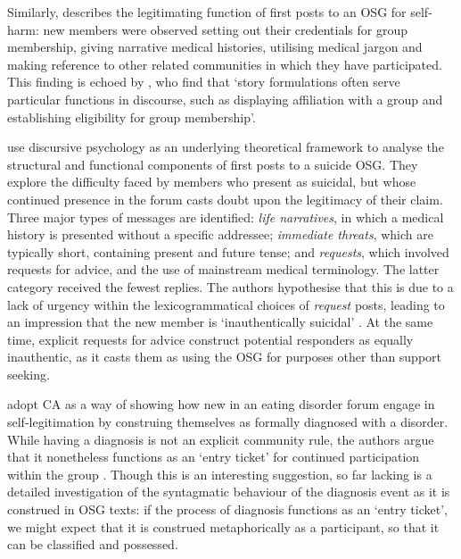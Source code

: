 Similarly, \textcite{smithson_membership_2011} describes the legitimating function of first \glspl{post} to an \gls{OSG} for self\hyp{}harm: new \glspl{member} were observed setting out their credentials for group membership, giving narrative medical histories, utilising medical jargon and making reference to other related communities in which they have participated. This finding is echoed by \textcite[p.~5]{varga2014grieving}, who find that `story formulations often serve particular functions in discourse, such as displaying affiliation with a group and establishing eligibility for group membership'.

\textcite[p.~173]{horne_doing_2009} use discursive psychology as an underlying theoretical framework to analyse the structural and functional components of first \glspl{post} to a suicide \gls{OSG}. They explore the difficulty faced by \glspl{member} who present as suicidal, but whose continued presence in the \gls{forum} casts doubt upon the legitimacy of their claim. Three major types of messages are identified: \emph{life narratives}, in which a medical history is presented without a specific addressee; \emph{immediate threats}, which are typically short, containing present and future tense; and \emph{requests}, which involved requests for advice, and the use of mainstream medical terminology. The latter category received the fewest replies. The authors hypothesise that this is due to a lack of urgency within the lexicogrammatical choices of \emph{request} \glspl{post}, leading to an impression that the new \gls{member} is `inauthentically suicidal' \parencite*[p.~180]{horne_doing_2009}. At the same time, explicit requests for advice construct potential responders as equally inauthentic, as it casts them as using the \gls{OSG} for purposes other than support seeking. 

\textcite{stommel_use_2011} adopt \gls{CA} as a way of showing how new  in an eating disorder \gls{forum} engage in self\hyp{}legitimation by construing themselves as formally diagnosed with a disorder. While having a diagnosis is not an explicit community rule, the authors argue that it nonetheless functions as an `entry ticket' for continued participation within the group \parencite*[p.~6]{stommel_use_2011}. Though this is an interesting suggestion, so far lacking is a detailed investigation of the syntagmatic behaviour of the diagnosis event as it is construed in \gls{OSG} texts: if the process of diagnosis functions as an `entry ticket', we might expect that it is construed metaphorically as a participant, so that it can be classified and possessed.

